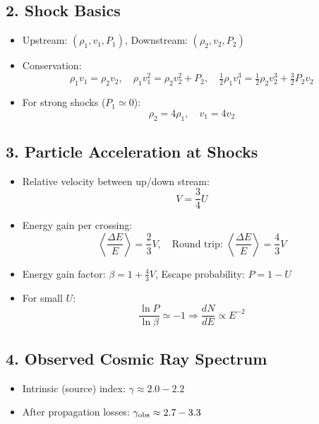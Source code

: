 \documentclass{sciposter}
\begin{document}
\begin{multicols}{3}
\subsection*{2. Shock Basics}
\begin{itemize}
    \item Upstream: $(\rho_1, v_1, P_1)$, Downstream: $(\rho_2, v_2, P_2)$
    \item Conservation:
    \[
        \rho_1 v_1 = \rho_2 v_2, \quad
        \rho_1 v_1^2 = \rho_2 v_2^2 + P_2, \quad
        \tfrac{1}{2}\rho_1 v_1^3 = \tfrac{1}{2}\rho_2 v_2^3 + \tfrac{3}{2}P_2 v_2
    \]
    \item For strong shocks ($P_1 \simeq 0$):
    \[
        \rho_2 = 4\rho_1, \quad v_1 = 4v_2
    \]
\end{itemize}

\subsection*{3. Particle Acceleration at Shocks}
\begin{itemize}
    \item Relative velocity between up/down stream:
    \[
        V = \frac{3}{4}U
    \]
    \item Energy gain per crossing:
    \[
        \left\langle \frac{\Delta E}{E} \right\rangle = \frac{2}{3}V, 
        \quad \text{Round trip: } \left\langle \frac{\Delta E}{E} \right\rangle = \frac{4}{3}V
    \]
    \item Energy gain factor: $\beta = 1 + \tfrac{4}{3}V$,  
          Escape probability: $P = 1 - U$
    \item For small $U$:
    \[
        \frac{\ln P}{\ln \beta} \simeq -1 \Rightarrow 
        \frac{dN}{dE} \propto E^{-2}
    \]
\end{itemize}

\subsection*{4. Observed Cosmic Ray Spectrum}
\begin{itemize}
    \item Intrinsic (source) index: $\gamma \approx 2.0 - 2.2$
    \item After propagation losses: $\gamma_{\rm obs} \approx 2.7 - 3.3$
\end{itemize}


\end{multicols}
\end{document}
